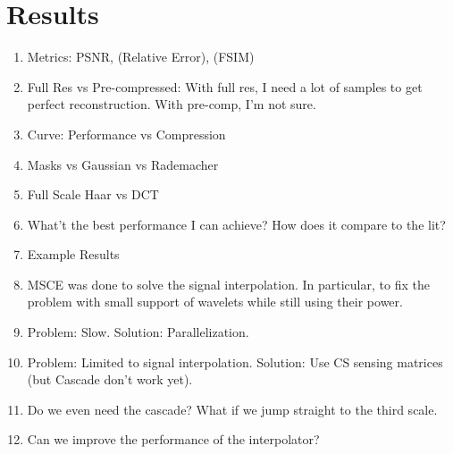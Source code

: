 \chapter{Results}
\label{ch:results}
\begin{enumerate}
\item Metrics: PSNR, (Relative Error), (FSIM)
\item Full Res vs Pre-compressed: With full res, I need a lot of samples to get perfect reconstruction. With pre-comp, I'm not sure.
\item Curve: Performance vs Compression
\item Masks vs Gaussian vs Rademacher
\item Full Scale Haar vs DCT
\item What't the best performance I can achieve? How does it compare to the lit?
\item Example Results
\item MSCE was done to solve the signal interpolation. In particular, to fix the problem with small support of wavelets while still using their power.
\item Problem: Slow. Solution: Parallelization.
\item Problem: Limited to signal interpolation. Solution: Use CS sensing matrices (but Cascade don't work yet).
\item Do we even need the cascade? What if we jump straight to the third scale.
\item Can we improve the performance of the interpolator? 
\end{enumerate}



